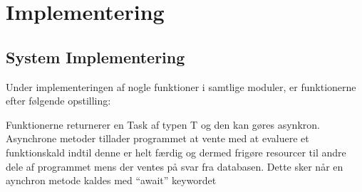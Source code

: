 \section{Implementering}
\subsection{System Implementering}
Under implementeringen af nogle funktioner i samtlige moduler, er funktionerne efter følgende opstilling:\\


Funktionerne returnerer en Task af typen T og den kan gøres asynkron. Asynchrone metoder tillader programmet
at vente med at evaluere et funktionskald indtil denne er helt færdig og dermed frigøre resourcer til andre
dele af programmet mens der ventes på svar fra databasen.
Dette sker når en aynchron metode kaldes med ``await'' keywordet \\






